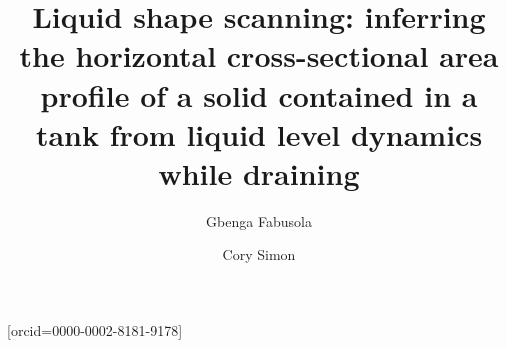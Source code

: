 \documentclass[a4paper,fleqn]{cas-dc}
\begin{document}
\let\WriteBookmarks\relax
\def\floatpagepagefraction{1}
\def\textpagefraction{.001}

\shorttitle{}    

\shortauthors{}  

\title [mode = title]{
Liquid shape scanning:
 inferring the horizontal cross-sectional area profile of a solid contained in a tank from liquid level dynamics while draining 
 }  

\tnotemark[1] 

\tnotetext[1]{} 

%

\author[1]{Gbenga Fabusola}%

\credit{}


\author[1]{Cory Simon}[orcid=0000-0002-8181-9178]

\cormark[1]


\ead[url]{}

\credit{}



\fntext[1]{}

\end{document}
